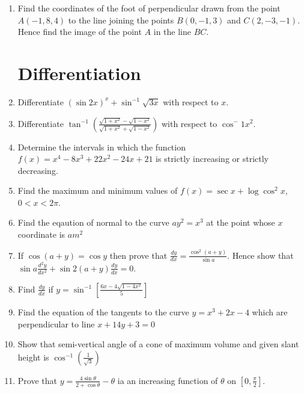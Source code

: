 \documentclass[12pt,-letter paper]{article}
\providecommand{\brak}[1]{\ensuremath{\left(#1\right)}}
\providecommand{\sbrak}[1]{\ensuremath{{}\left[#1\right]}}
\providecommand{\brak}[1]{\ensuremath{\left(#1\right)}}
\begin{document}
\begin{enumerate}
	\item Find the coordinates of the foot of perpendicular drawn from the point
$A(-1, 8, 4)$ to the line joining the points $B(0, -1, 3)$ and $C(2,-3,-1)$. Hence
find the image of the point $A$ in the line $BC$.

	

\section{Differentiation}
	\item Differentiate $(\sin 2x)^x + \sin^{-1} \sqrt{3x}$ with respect to $x$.
	
	\item Differentiate $\tan^{-1} \brak{\frac{\sqrt{1 + x^2}-\sqrt{1-x^2}}{\sqrt{1+x^2}+\sqrt{1-x^2}}}$
with respect to $\cos^-1 x^2$.

	\item Determine the intervals in which the function $f (x) = x^4 - 8x^3 + 22x^2 - 24x+21$ is strictly increasing or strictly decreasing.

	\item Find the maximum and minimum values of $f (x) = \sec x + \log \cos^2 x$, $0 < x < 2\pi$.

	\item Find the eqaution of normal to the curve $ay^2 = x^3$ at the point whose $x$ coordinate is $am^2$
	
	
	\item If $\cos(a+y) = \cos y$ then prove that
$\frac{dy}{dx} = \frac{\cos^{2}(a+y)}{\sin a}$. 
Hence show that \\
$\sin a \frac{d^{2}y}{dx^{2}} + \sin 2(a+y)\frac{dy}{dx} = 0 $.

	\item Find $\frac{dy}{dx}$ if $y = \sin^{-1}\sbrak{\frac{6x - 4\sqrt{1-4x^2}}{5}}$ 

	\item Find the equation of the tangents to the curve $y = x^3 + 2x - 4$ which are perpendicular to line $x + 14y + 3 = 0$
	
	\item Show that semi-vertical angle of a cone of maximum volume and given slant height is
$\cos^{-1}\left( \frac{1}{\sqrt{3}} \right)$

	\item Prove that $ y = \frac{4\sin \theta}{2+ \cos \theta} - \theta$ ia an increasing function of $\theta$ on $\sbrak{0,\frac{\pi}{2}}$.




\end{enumerate}
\end{document}

